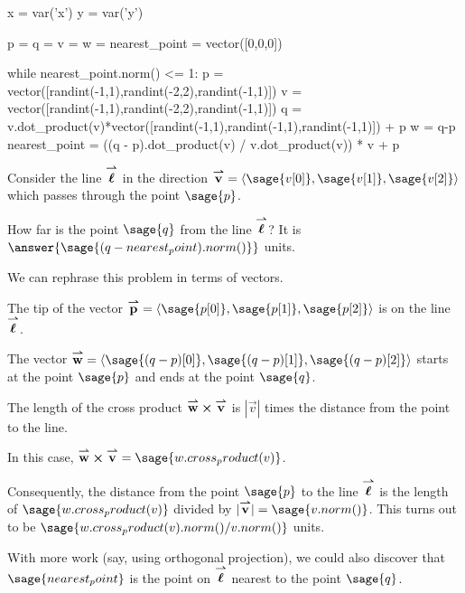\documentclass{ximera}
\author{Jim Fowler}
\begin{document}
\makerandom

\begin{sagesilent}
  x = var('x')
  y = var('y')

  p = q = v = w = nearest_point = vector([0,0,0])

  while nearest_point.norm() <= 1:
    p = vector([randint(-1,1),randint(-2,2),randint(-1,1)])
    v = vector([randint(-1,1),randint(-2,2),randint(-1,1)])
    q = v.dot_product(v)*vector([randint(-1,1),randint(-1,1),randint(-1,1)]) + p
    w = q-p
    nearest_point = ((q - p).dot_product(v) / v.dot_product(v)) * v + p
\end{sagesilent}

\begin{exercise}
  Consider the line ${\overset{\boldsymbol{\rightharpoonup}}{\mathbf{\boldsymbol{\ell}}}}$ in the direction $\vec{v} = \vector{\sage{v[0]},\sage{v[1]},\sage{v[2]}}$ which passes through the point $\sage{p}$.
  
  How far is the point \(\sage{q}\) from the line \({\overset{\boldsymbol{\rightharpoonup}}{\mathbf{\boldsymbol{\ell}}}}\)?  It is
  \(\answer{\sage{(q - nearest_point).norm()}}\) units.

  \begin{hint}
    We can rephrase this problem in terms of vectors.
  \end{hint}

  \begin{hint}
    The tip of the vector $\vec{p} = \vector{\sage{p[0]},\sage{p[1]},\sage{p[2]}}$ is on the line ${\overset{\boldsymbol{\rightharpoonup}}{\mathbf{\boldsymbol{\ell}}}}$.
  \end{hint}

  \begin{hint}
    The vector $\vec{w} = \vector{\sage{(q-p)[0]},\sage{(q-p)[1]},\sage{(q-p)[2]}}$ starts at the point $\sage{p}$ and ends at the point $\sage{q}$.
  \end{hint}

  \begin{hint}
    The length of the cross product ${\overset{\boldsymbol{\rightharpoonup}}{\mathbf{w}}} \boldsymbol\times {\overset{\boldsymbol{\rightharpoonup}}{\mathbf{v}}}$ is $|\vec{v}|$ times the distance from the point to the line.
  \end{hint}

  \begin{hint}
    In this case, $\vec{w} \cross \vec{v} = \sage{w.cross_product(v)}$.
  \end{hint}

  \begin{hint}
    Consequently, the distance from the point $\sage{p}$ to the line ${\overset{\boldsymbol{\rightharpoonup}}{\mathbf{\boldsymbol{\ell}}}}$ is the length of $\sage{w.cross_product(v)}$ divided by $|\vec{v}| = \sage{v.norm()}$.  This turns out to be $\sage{w.cross_product(v).norm()/v.norm()}$ units.
  \end{hint}

  \begin{hint}
    With more work (say, using orthogonal projection), we could also discover that $\sage{nearest_point}$ is the point on ${\overset{\boldsymbol{\rightharpoonup}}{\mathbf{\boldsymbol{\ell}}}}$ nearest to the point $\sage{q}$.
  \end{hint}
  
\end{exercise}
\end{document}
